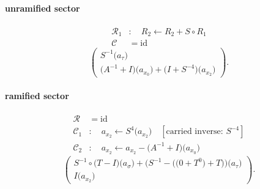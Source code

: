 \paragraph{unramified sector}
\[\begin{aligned}\mathcal R_{1}&:\quad R_2\leftarrow R_2+S\circ R_1\\\mathcal C&=\mathrm{id}\end{aligned}\]
\[\begin{pmatrix}S^{-1}\bigl(a_{\tau}\bigr)\\\bigl(A^{-1}+I\bigr)\bigl(a_{x_{0}}\bigr)+\bigl(I+S^{-4}\bigr)\bigl(a_{x_{2}}\bigr)\end{pmatrix}.\]
\paragraph{ramified sector}
\[\begin{aligned}\mathcal R&=\mathrm{id}\\\mathcal C_{1}&:\quad a_{x_{2}}\leftarrow S^{4}\bigl(a_{x_{2}}\bigr)\quad[\text{carried inverse: }S^{-4}]\\\mathcal C_{2}&:\quad a_{x_{2}}\leftarrow a_{x_{2}}-\bigl(A^{-1}+I\bigr)\bigl(a_{x_{0}}\bigr)\end{aligned}\]
\[\begin{pmatrix}S^{-1}\circ \bigl(T-I\bigr)\bigl(a_{\sigma}\bigr)+\bigl(S^{-1}-\bigl(\bigl(0+T^{0}\bigr)+T\bigr)\bigr)\bigl(a_{\tau}\bigr)\\I\bigl(a_{x_{2}}\bigr)\end{pmatrix}.\]
